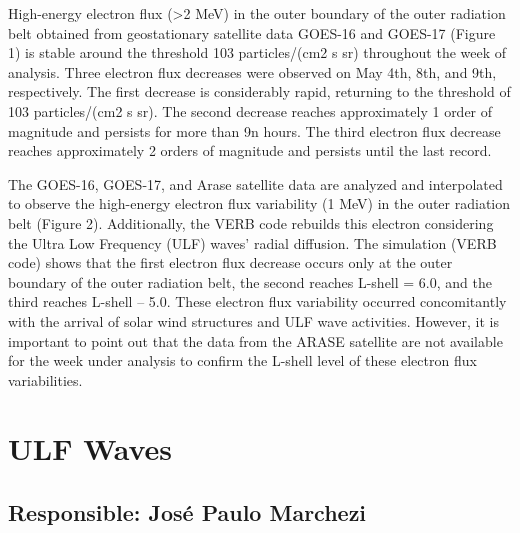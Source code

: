 \documentclass[11pt, oneside]{article}
\begin{document}
                     High-energy electron flux (>2 MeV) in the outer boundary of the outer radiation belt obtained from geostationary satellite data GOES-16 and GOES-17 (Figure 1) is stable around the threshold 103 particles/(cm2 s sr) throughout the week of analysis. Three electron flux decreases were observed on May 4th, 8th, and 9th, respectively. The first decrease is considerably rapid, returning to the threshold of 103 particles/(cm2 s sr). The second decrease reaches approximately 1 order of magnitude and persists for more than 9n hours. The third electron flux decrease reaches approximately 2 orders of magnitude and persists until the last record.    

The GOES-16, GOES-17, and Arase satellite data are analyzed and interpolated to observe the high-energy electron flux variability (1 MeV) in the outer radiation belt (Figure 2). Additionally, the VERB code rebuilds this electron considering the Ultra Low Frequency (ULF) waves' radial diffusion. The simulation (VERB code) shows that the first electron flux decrease occurs only at the outer boundary of the outer radiation belt, the second reaches L-shell = 6.0, and the third reaches L-shell – 5.0. These electron flux variability occurred concomitantly with the arrival of solar wind structures and ULF wave activities. However, it is important to point out that the data from the ARASE satellite are not available for the week under analysis to confirm the L-shell level of these electron flux variabilities.\section{ULF Waves} 
 \subsection{Responsible: José Paulo Marchezi} 
 
\end{document}
